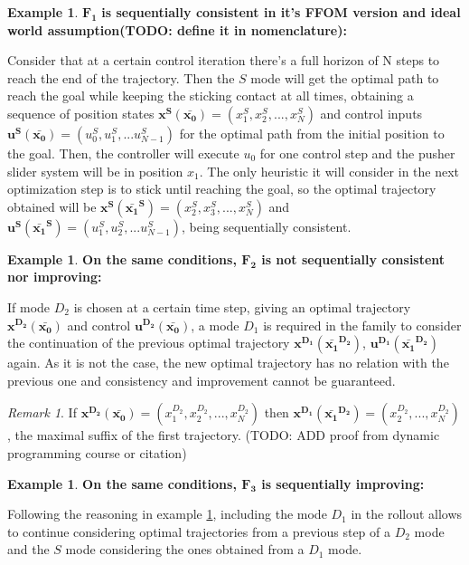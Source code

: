 \documentclass[12,twoside]{TFG-GM}
\theoremstyle{definition}
\newtheorem{example}[theorem]{Example}
\theoremstyle{remark}
\newtheorem{remark}[theorem]{Remark}
\newcommand*\diff[1]{\bar{#1}}
\begin{document}
\begin{example} $\boldsymbol{F_1}$ \textbf{is sequentially consistent in it's FFOM version and ideal world assumption(TODO: define it in nomenclature):}

Consider that at a certain control iteration there's a full horizon of N steps to reach the end of the trajectory. Then the $S$ mode will get the optimal path to reach the goal while keeping the sticking contact at all times, obtaining a sequence of position states $\boldsymbol{x^{S}(\diff{x_0})} = (x_1^S, x_2^S, ..., x_N^S)$ and control inputs $\boldsymbol{u^{S}(\diff{x_0})} = (u_0^S, u_1^S, ... u_{N-1}^S)$ for the optimal path from the initial position to the goal. Then, the controller will execute $u_0$ for one control step and the pusher slider system will be in position $x_1$. The only heuristic it will consider in the next optimization step is to stick until reaching the goal, so the optimal trajectory obtained will be $\boldsymbol{x^{S}(\diff{x_1}^S)} = (x_2^S, x_3^S, ..., x_N^S)$ and $\boldsymbol{u^{S}(\diff{x_1}^S)} = (u_1^S, u_2^S, ... u_{N-1}^S)$, being sequentially consistent.
\end{example}
\begin{example} \label{ex:f2notconsistent} \textbf{On the same conditions, $\boldsymbol{F_2}$ is not sequentially consistent nor improving:}

If mode $D_2$ is chosen at a certain time step, giving an optimal trajectory $\boldsymbol{x^{D_2}(\diff{x_0})}$ and control $\boldsymbol{u^{D_2}(\diff{x_0})}$, a mode $D_1$ is required in the family to consider the continuation of the previous optimal trajectory $\boldsymbol{x^{D_1}(\diff{x_1}^{D_2})}$,  $\boldsymbol{u^{D_1}(\diff{x_1}^{D_2})}$ again. As it is not the case, the new optimal trajectory has no relation with the previous one and consistency and improvement cannot be guaranteed.
\end{example}

\begin{remark}
If $\boldsymbol{x^{D_2}(\diff{x_0})} = (x_1^{D_2}, x_2^{D_2}, ..., x_N^{D_2})$ then $\boldsymbol{x^{D_1}(\diff{x_1}^{D_2})} = (x_2^{D_2}, ..., x_N^{D_2})$, the maximal suffix of the first trajectory. (TODO: ADD proof from dynamic programming course or citation)
\end{remark}

\begin{example} \textbf{On the same conditions, $\boldsymbol{F_3}$ is sequentially improving:}

Following the reasoning in example \ref{ex:f2notconsistent}, including the mode $D_1$ in the rollout allows to continue considering optimal trajectories from a previous step of a $D_2$ mode and the $S$ mode considering the ones obtained from a $D_1$ mode.
\end{example}
\end{document}
